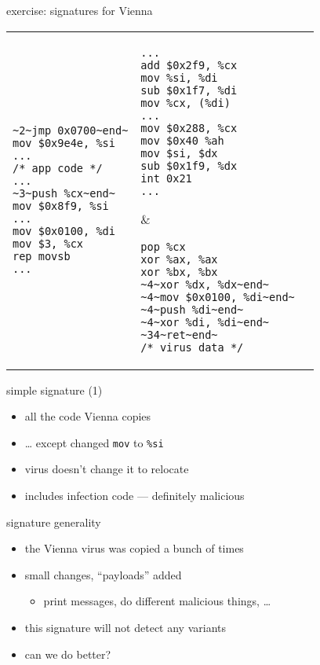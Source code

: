 \begin{frame}[fragile,label=viennaSigs]{exercise: signatures for Vienna}
\begin{tabular}{lll}
\begin{lstlisting}
~2~jmp 0x0700~end~
mov $0x9e4e, %si
...
/* app code */
...
~3~push %cx~end~
mov $0x8f9, %si
...
mov $0x0100, %di
mov $3, %cx
rep movsb
...
\end{lstlisting}
&
\begin{lstlisting}
...
add $0x2f9, %cx
mov %si, %di
sub $0x1f7, %di
mov %cx, (%di)
...
mov $0x288, %cx
mov $0x40 %ah
mov $si, $dx
sub $0x1f9, %dx
int 0x21
...
\end{lstlisting}
&
\begin{lstlisting}
pop %cx
xor %ax, %ax
xor %bx, %bx
~4~xor %dx, %dx~end~
~4~mov $0x0100, %di~end~
~4~push %di~end~
~4~xor %di, %di~end~
~34~ret~end~
/* virus data */
\end{lstlisting}
\\
\end{tabular}
\end{frame}

\begin{frame}{simple signature (1)}
    \begin{itemize}
    \item all the code Vienna copies
    \item \ldots{} except changed {\tt mov} to {\tt \%si}
    \vspace{.5cm}
    \item virus doesn't change it to relocate
    \item includes infection code --- definitely malicious
    \end{itemize}
\end{frame}

\begin{frame}{signature generality}
    \begin{itemize}
    \item the Vienna virus was copied a bunch of times
    \item small changes, ``payloads'' added
        \begin{itemize}
        \item print messages, do different malicious things, \ldots
        \end{itemize}
    \item this signature will not detect any variants
    \item can we do better?
    \end{itemize}
\end{frame}

